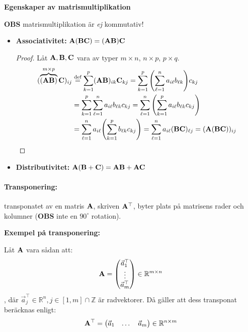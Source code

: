 \begin{features}
	\textbf{Egenskaper av matrismultiplikation}

	\textbf{OBS} matrismultiplikation är \emph{ej} kommutativ!

	\begin{itemize}
		\item \textbf{Associativitet:} $\mathbf{A}(\mathbf{B}\mathbf{C})=(\mathbf{A}\mathbf{B})\mathbf{C}$ \begin{proof}
			Låt $\mathbf{A},\mathbf{B},\mathbf{C}$ vara av typer $m\times n$, $n\times p$, $p\times q$.
			\begin{align*}
				(\overbrace{(\mathbf{A}\mathbf{B})}^{m\times p}\mathbf{C})_{ij}
				&\stackrel{\text{def}}{=}\sum_{k=1}^p(\mathbf{A}\mathbf{B})_{ik}\mathbf{C}_{kj}
				=\sum_{k=1}^p\qty(\sum_{\ell=1}^na_{i\ell}b_{\ell k})c_{kj}\\
				&=\sum_{k=1}^p\sum_{\ell=1}^na_{i\ell}b_{\ell k}c_{kj}
				=\sum_{\ell=1}^n\qty(\sum_{k=1}^pa_{i\ell}b_{\ell k}c_{kj})\\
				&=\sum_{\ell=1}^na_{i\ell}\qty(\sum_{k=1}^pb_{\ell k}c_{kj})
				=\sum_{\ell=1}^na_{i\ell}(\mathbf{B}\mathbf{C})_{\ell j}
				=(\mathbf{A}(\mathbf{B}\mathbf{C}))_{ij}
			\end{align*}
		\end{proof}
		\item \textbf{Distributivitet:} $\mathbf{A}(\mathbf{B}+\mathbf{C})=\mathbf{A}\mathbf{B}+\mathbf{A}\mathbf{C}$ 
	\end{itemize}
\end{features}

\paragraph{Transponering:}\label{s:matris-transponering}
transponatet av en matris $\mathbf{A}$, skriven $\mathbf{A}^\top$,
byter plats på matrisens rader och kolumner (\textbf{OBS} inte en $90^\circ$ rotation).

\begin{ber}
	\textbf{Exempel på transponering:}

	Låt $\mathbf{A}$ vara sådan att:
	$$
		\mathbf{A}=\qty(\begin{matrix}
			\vec{a}_1^\top\\
			\vdots\\
			\vec{a}_m^\top
		\end{matrix})\in\mathbb{R}^{m\times n}
	$$, där $\vec{a}^\top_j\in\mathbb{R}^n, j\in[1,m]\cap\mathbb{Z}$
	är radvektorer. Då gäller att dess transponat beräcknas enligt:
	$$
		\mathbf{A}^\top=\qty(\begin{matrix}
			\vec{a}_1&\dots&\vec{a}_m
		\end{matrix})\in\mathbb{R}^{n\times m}
	$$
\end{ber}

